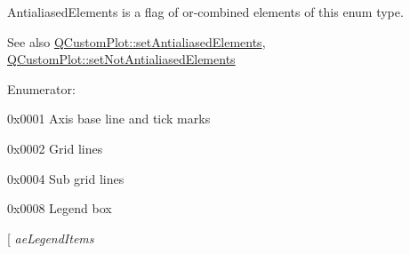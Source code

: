 {\ttfamily \-Antialiased\-Elements} is a flag of or-\/combined elements of this enum type.

\begin{DoxySeeAlso}{\-See also}
\hyperlink{classQCustomPlot_af6f91e5eab1be85f67c556e98c3745e8}{\-Q\-Custom\-Plot\-::set\-Antialiased\-Elements}, \hyperlink{classQCustomPlot_ae10d685b5eabea2999fb8775ca173c24}{\-Q\-Custom\-Plot\-::set\-Not\-Antialiased\-Elements} 
\end{DoxySeeAlso}
\begin{Desc}
\item[\-Enumerator\-: ]\par
\begin{description}
\item[{\em 
\hypertarget{namespaceQCP_ae55dbe315d41fe80f29ba88100843a0caefa92e89cd37f8a081fd2075aa1af73f}{ae\-Axes}\label{namespaceQCP_ae55dbe315d41fe80f29ba88100843a0caefa92e89cd37f8a081fd2075aa1af73f}
}]{\ttfamily 0x0001} \-Axis base line and tick marks \item[{\em 
\hypertarget{namespaceQCP_ae55dbe315d41fe80f29ba88100843a0ca4fbb37118d62288af0ca601ff2b07a2f}{ae\-Grid}\label{namespaceQCP_ae55dbe315d41fe80f29ba88100843a0ca4fbb37118d62288af0ca601ff2b07a2f}
}]{\ttfamily 0x0002} \-Grid lines \item[{\em 
\hypertarget{namespaceQCP_ae55dbe315d41fe80f29ba88100843a0caaedf83369188a15a69f92bb1d85ca97b}{ae\-Sub\-Grid}\label{namespaceQCP_ae55dbe315d41fe80f29ba88100843a0caaedf83369188a15a69f92bb1d85ca97b}
}]{\ttfamily 0x0004} \-Sub grid lines \item[{\em 
\hypertarget{namespaceQCP_ae55dbe315d41fe80f29ba88100843a0ca9e0127a6361b5d0596b031a482c5cf97}{ae\-Legend}\label{namespaceQCP_ae55dbe315d41fe80f29ba88100843a0ca9e0127a6361b5d0596b031a482c5cf97}
}]{\ttfamily 0x0008} \-Legend box \item[{\em 
\hypertarget{namespaceQCP_ae55dbe315d41fe80f29ba88100843a0ca1aca7a50c1b95403958733a4acafe773}{ae\-Legend\-Items}\label{namespaceQCP_ae55dbe315d41fe80f29ba88100843a0ca1aca7a50c1b95403958733a4acafe773}
}
\end{description}
\end{Desc}
